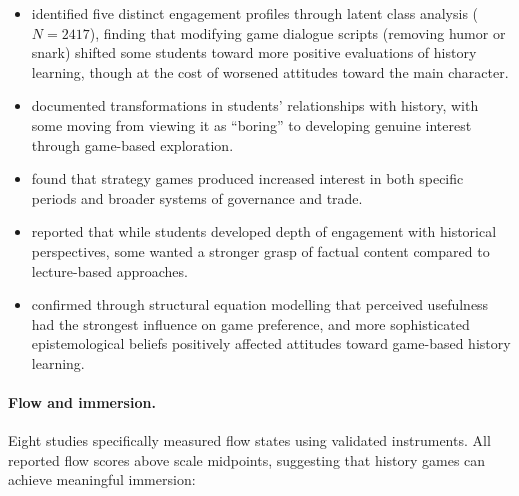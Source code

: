 \documentclass[a4paper,fleqn]{cas-sc}
\begin{document}
\begin{itemize}[noitemsep]
 \item \citet{15Slater2022} identified five distinct engagement profiles through latent class analysis ($N=2417$), finding that modifying game dialogue scripts (removing humor or snark) shifted some students toward more positive evaluations of history learning, though at the cost of worsened attitudes toward the main character.
 \item \citet{55Squire2004} documented transformations in students' relationships with history, with some moving from viewing it as ``boring'' to developing genuine interest through game-based exploration.
 \item \citet{40Kuran2018} found that strategy games produced increased interest in both specific periods and broader systems of governance and trade.
 \item \citet{29Stiso20201165} reported that while students developed depth of engagement with historical perspectives, some wanted a stronger grasp of factual content compared to lecture-based approaches.
 \item \citet{44Shiue2016} confirmed through structural equation modelling that perceived usefulness had the strongest influence on game preference, and more sophisticated epistemological beliefs positively affected attitudes toward game-based history learning.
\end{itemize}

\paragraph{Flow and immersion.}

Eight studies specifically measured flow states using validated instruments. All reported flow scores above scale midpoints, suggesting that history games can achieve meaningful immersion:
\end{document}
